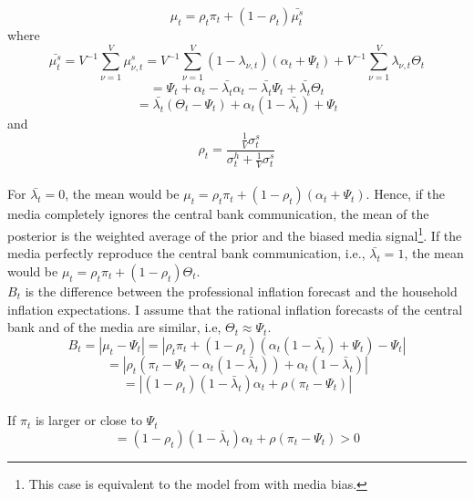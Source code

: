 \documentclass[review]{elsarticle}
\begin{document}
\begin{equation}
\mu_t = \rho_t \pi_t + (1- \rho_t) \bar{\mu_t^s} 
\end{equation}
where
\begin{equation}
\bar{\mu_t^s} = V^{-1} \sum^V_{\nu = 1} \mu_{\nu,t}^s = V^{-1} \sum^V_{\nu =1} (1-\lambda_{\nu,t}) (\alpha_t + \Psi_t) + V^{-1} \sum^V_{\nu =1} \lambda_{\nu,t} \Theta_t  
\end{equation}
\begin{equation}
=\Psi_t + \alpha_t - \bar{\lambda_t} \alpha_t - \bar{\lambda_t} \Psi_t + \bar{\lambda_t}\Theta_t 
\end{equation}
\begin{equation}
=\bar{\lambda_t}(\Theta_t - \Psi_t) + \alpha_t(1- \bar{\lambda_t}) + \Psi_t
\end{equation}
and
\begin{equation}
\rho_t = \frac{\frac{1}{V}\sigma^s_t}{{\sigma^h_t + \frac{1}{V}}\sigma^s_t}
\end{equation}
\\
For $\bar{\lambda_t} = 0$, the mean would be $\mu_t = \rho_t \pi_t + (1- \rho_t) (\alpha_t + \Psi_t)$. Hence, if the media completely ignores the central bank communication, the mean of the posterior is the weighted average of the prior and the biased media signal\footnote{This case is equivalent to the model from \cite{LamlaLein2014} with media bias.}. If the media perfectly reproduce the central bank communication, i.e., $\bar{\lambda_t} = 1$, the mean would be $\mu_t = \rho_t \pi_t + (1-\rho_t) \Theta_t$. 
\\
$B_t$ is the difference between the professional inflation forecast and the household inflation expectations. I assume that the rational inflation forecasts of the central bank and of the media are similar, i.e, $\Theta_t \approx \Psi_t$.
\begin{equation}
B_t = |\mu_t - \Psi_t| = |\rho_t \pi_t + (1-\rho_t)(\alpha_t(1- \bar{\lambda_t}) + \Psi_t) - \Psi_t|
\end{equation}
\begin{equation}
= |\rho_t (\pi_t - \Psi_t - \alpha_t (1-\bar{\lambda}_t)) + \alpha_t (1- \bar{\lambda}_t)|
\end{equation}
\begin{equation}
= |(1-\rho_t)(1-\bar{\lambda}_t)\alpha_t + \rho(\pi_t - \Psi_t)|
\end{equation}
\\
If $\pi_t$ is larger or close to $\Psi_t$ 
\begin{equation}
= (1-\rho_t)(1-\bar{\lambda}_t)\alpha_t + \rho(\pi_t - \Psi_t) > 0
\end{equation} 
\end{document}
